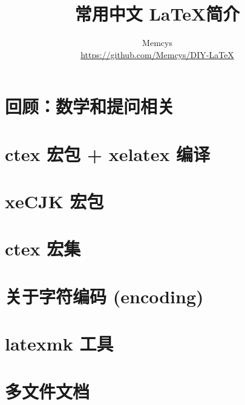 \documentclass{ctexart}
\title{常用中文 \LaTeX 简介}
\author{Memcys \\ \url{https://github.com/Memcys/DIY-LaTeX}}
\begin{document}
\maketitle

\setcounter{section}{-1}

\section{回顾：数学和提问相关}


\tableofcontents

\section{ctex 宏包 + xelatex 编译}


\section{xeCJK 宏包}


\section{ctex 宏集}


\appendix
\section{关于字符编码 (encoding)}


\section{latexmk 工具}\label{ap:latexmk}


\section{多文件文档}


\listoftables
\lstlistoflistings
{}\label{lstof:exercises}

\printbibliography
\end{document}
